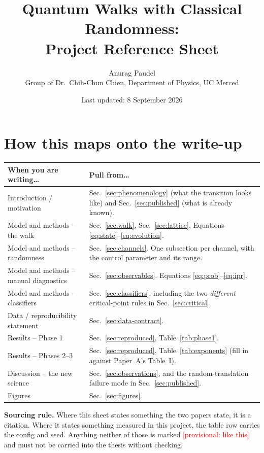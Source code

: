 \documentclass[11pt]{article}
\title{Quantum Walks with Classical Randomness:\\
       Project Reference Sheet}
\author{Anurag Paudel \\ \small Group of Dr.\ Chih-Chun Chien, Department of Physics, UC Merced}
\date{Last updated: 8 September 2026}
\newcommand{\provisional}[1]{\textcolor{red}{[provisional: #1]}}
\begin{document}
\maketitle
\tableofcontents
\newpage

\section{How this maps onto the write-up}
\label{sec:writeup-map}

\begin{longtable}{p{} p{}}
\toprule
\textbf{When you are writing\dots} & \textbf{Pull from\dots} \\
\midrule
\endhead
Introduction / motivation
  & Sec.~\ref{sec:phenomenology} (what the transition looks like) and
    Sec.~\ref{sec:published} (what is already known). \\
Model and methods -- the walk
  & Sec.~\ref{sec:walk}, Sec.~\ref{sec:lattice}. Equations
    \eqref{eq:state}--\eqref{eq:evolution}. \\
Model and methods -- randomness
  & Sec.~\ref{sec:channels}. One subsection per channel, with the control
    parameter and its range. \\
Model and methods -- manual diagnostics
  & Sec.~\ref{sec:observables}. Equations
    \eqref{eq:prob}--\eqref{eq:ipr}. \\
Model and methods -- classifiers
  & Sec.~\ref{sec:classifiers}, including the two \emph{different}
    critical-point rules in Sec.~\ref{sec:critical}. \\
Data / reproducibility statement
  & Sec.~\ref{sec:data-contract}. \\
Results -- Phase 1
  & Sec.~\ref{sec:reproduced}, Table~\ref{tab:phase1}. \\
Results -- Phases 2--3
  & Sec.~\ref{sec:reproduced}, Table~\ref{tab:exponents} (fill in against
    Paper~A's Table~I). \\
Discussion -- the new science
  & Sec.~\ref{sec:observations}, and the random-translation failure mode in
    Sec.~\ref{sec:published}. \\
Figures
  & Sec.~\ref{sec:figures}. \\
\bottomrule
\end{longtable}

\noindent
\textbf{Sourcing rule.} Where this sheet states something the two papers
state, it is a citation. Where it states something measured in this project,
the table row carries the config and seed. Anything neither of those is
marked \provisional{like this} and must not be carried into the thesis
without checking.
\end{document}
